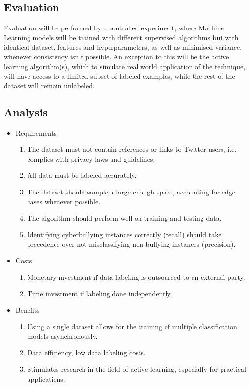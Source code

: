 \documentclass[a4paper,12pt]{article}
\begin{document}
\subsection{Evaluation}
Evaluation will be performed by a controlled experiment, where Machine Learning models will be trained with different supervised algorithms but with identical dataset, features and hyperparameters, as well as minimised variance, whenever consistency isn't possible. An exception to this will be the active learning algorithm(s), which to simulate real world application of the technique, will have access to a limited subset of labeled examples, while the rest of the dataset will remain unlabeled.
\subsection{Analysis}
\begin{itemize}
    \item Requirements
    \begin{enumerate}
        \item The dataset must not contain references or links to Twitter users, i.e. complies with privacy laws and guidelines.
        \item All data must be labeled accurately.
        \item The dataset should sample a large enough space, accounting for edge cases whenever possible.
        \item The algorithm should perform well on training and testing data.
        \item Identifying cyberbullying instances correctly (recall) should take precedence over not misclassifying non-bullying instances (precision).
    \end{enumerate}
    \item Costs
    \begin{enumerate}
        \item Monetary investment if data labeling is outsourced to an external party.
        \item Time investment if labeling done independently.
    \end{enumerate}
    \item Benefits
    \begin{enumerate}
        \item Using a single dataset allows for the training of multiple classification models asynchronously.
        \item Data efficiency, low data labeling costs.
        \item Stimulates research in the field of active learning, especially for practical applications.

\end{enumerate}
\end{itemize}
\end{document}
